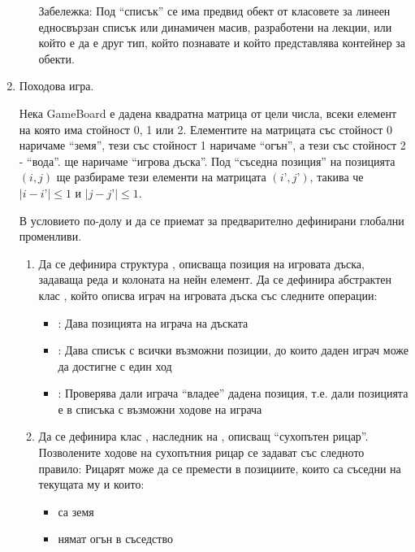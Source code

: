 \begin{enumerate}
\begin{enumerate}[label=\alph*)]
\begin{flushleft}
      Забележка: Под ``списък'' се има предвид обект от класовете за линеен едносвързан списък или динамичен масив, разработени на лекции, или който е да е друг тип, който познавате и който представлява контейнер за обекти.

      \end{flushleft}

    \end{enumerate}


    \item \label{zad:boardgame}Походова игра.

    Нека GameBoard е дадена квадратна матрица  от цели числа, всеки елемент на която има стойност 0, 1 или 2. Елементите на матрицата със стойност 0 наричаме ``земя'', тези със стойност 1 наричаме ``огън'', а тези със стойност 2 - ``вода''.  ще наричаме ``игрова дъска''. Под ``съседна позиция'' на позицията $(i,j)$ ще разбираме тези елементи на матрицата $(i’,j’)$, такива че $|i-i’| \leq 1$ и $|j-j’| \leq 1$.

    В условието по-долу  и  да се приемат за предварително дефинирани глобални променливи.

    \begin{enumerate}[label=\alph*)]
      \item Да се дефинира структура , описваща позиция на игровата дъска, задаваща реда и колоната на нейн елемент. Да се дефинира абстрактен клас , който описва играч на игровата дъска със следните операции:

      \begin{itemize}
        \item {}: Дава позицията на играча на дъската
        \item {}: Дава списък с всички възможни позиции, до които даден играч може да достигне с един ход
        \item {}: Проверява дали играча ``владее'' дадена позиция, т.е. дали позицията е в списъка с възможни ходове на играча

      \end{itemize}

      \item Да се дефинира клас , наследник на , описващ ``сухопътен рицар''. Позволените ходове на сухопътния рицар се задават със следното правило: Рицарят може да се премести в позициите, които са съседни на текущата му и които:
      \begin{itemize}
        \item са земя
        \item нямат огън в съседство
      \end{itemize}


\end{enumerate}
\end{enumerate}
